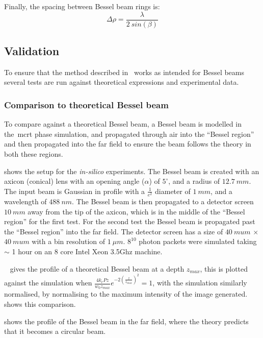 Finally, the spacing between Bessel beam rings is:
\begin{equation}
\Delta \rho = \frac{\lambda}{2\ sin\left(\beta\right)}
\end{equation}

\subsection{Validation}

To ensure that the method described in~ works as intended for Bessel beams several tests are run against theoretical expressions and experimental data.

\subsubsection*{Comparison to theoretical Bessel beam}

To compare against a theoretical Bessel beam, a Bessel beam is modelled in the~\gls*{mcrt} phase simulation, and propagated through air into the ``Bessel region'' and then propagated into the far field to ensure the beam follows the theory in both these regions.

 shows the setup for the \textit{in-silico} experiments.
The Bessel beam is created with an axicon (conical) lens with an opening angle ($\alpha$) of $5^{\circ}$, and a radius of $12.7~mm$.
The input beam is Gaussian in profile with a $\tfrac{1}{e^2}$ diameter of $1~mm$, and a wavelength of $488~nm$.
The Bessel beam is then propagated to a detector screen $10~mm$ away from the tip of the axicon, which is in the middle of the ``Bessel region'' for the first test.
For the second test the Bessel beam is propagated past the ``Bessel region'' into the far field.
The detector screen has a size of $40~mu m$ $\times$ $40~mu m$ with a bin resolution of $1~\mu m$.
$8^10$ photon packets were simulated taking $\sim$ 1 hour on an 8 core Intel Xeon 3.5Ghz machine.

\medskip

~ gives the profile of a theoretical Bessel beam at a depth $z_{max}$, this is plotted against the simulation when $\tfrac{4k_rPz}{w_0z_{max}}e^{-2\left(\tfrac{z}{z_{max}}\right)^2}=1$, with the simulation similarly normalised, by normalising to the maximum intensity of the image generated. ~ shows this comparison.

 shows the profile of the Bessel beam in the far field, where the theory predicts that it becomes a circular beam.

